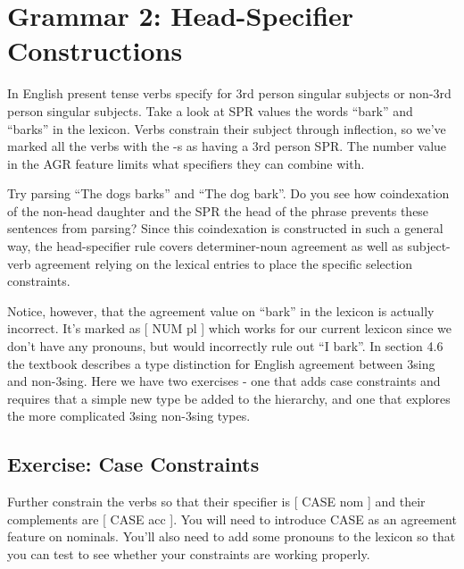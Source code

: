 
\section{Grammar 2: Head-Specifier Constructions}

In English present tense verbs specify for 3rd person singular subjects or non-3rd person singular subjects.  Take a look at SPR values the words ``bark'' and ``barks'' in the lexicon.  Verbs constrain their subject through inflection, so we've marked all the verbs with the -s as having a 3rd person SPR.  The number value in the AGR feature limits what specifiers they can combine with.  

Try parsing ``The dogs barks'' and ``The dog bark''.  Do you see how coindexation of the non-head daughter and the SPR the head of the phrase prevents these sentences from parsing?  Since this coindexation is constructed in such a general way, the head-specifier rule covers determiner-noun agreement as well as subject-verb agreement relying on the lexical entries to place the specific selection constraints.


Notice, however, that the agreement value on ``bark'' in the lexicon is actually incorrect.  It's marked as [ NUM pl ] which works for our current lexicon since we don't have any pronouns, but would incorrectly rule out ``I bark''.  In section 4.6 the textbook describes a type distinction for English agreement between 3sing and non-3sing.  Here we have two exercises - one that adds case constraints and requires that a simple new type be added to the hierarchy, and one that explores the more complicated 3sing non-3sing types.



\subsection{Exercise: Case Constraints}

Further constrain the verbs so that their specifier is [ CASE nom ] and their complements are [ CASE acc ].  You will need to introduce CASE as an agreement feature on nominals.  You'll also need to add some pronouns to the lexicon so that you can test to see whether your constraints are working properly.


